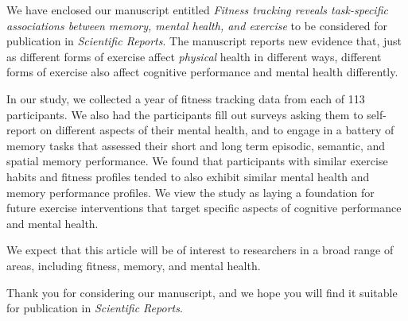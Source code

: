 \documentclass[11pt,stdletter,orderfromtodate,sigleft]{newlfm}
\begin{document}
\begin{newlfm}
We have enclosed our manuscript entitled \textit{Fitness tracking
  reveals task-specific associations between memory, mental health,
  and exercise} to be considered for publication in \textit{Scientific
  Reports}.  The manuscript reports new evidence that, just as different
forms of exercise affect \textit{physical} health in different ways,
different forms of exercise also affect cognitive performance and
mental health differently.

In our study, we collected a year of fitness tracking data from each
of 113 participants.  We also had the participants fill out surveys
asking them to self-report on different aspects of their mental
health, and to engage in a battery of memory tasks that assessed their
short and long term episodic, semantic, and spatial memory
performance.  We found that participants with similar exercise habits
and fitness profiles tended to also exhibit similar mental health and
memory performance profiles.  We view the study as laying a foundation
for future exercise interventions that target specific aspects of
cognitive performance and mental health.


We expect that this article will be of interest to researchers in a
broad range of areas, including fitness, memory, and mental health.

Thank you for considering our manuscript, and we hope you will find it
suitable for publication in \textit{Scientific Reports}.


\end{newlfm}
\end{document}
